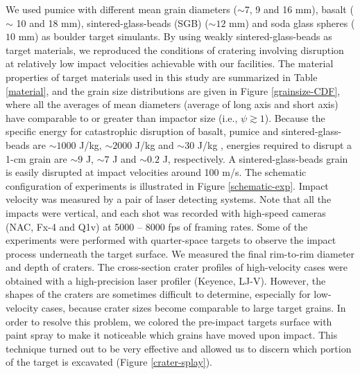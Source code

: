 \documentclass[3p,authoryear]{elsarticle}
\begin{document}
We used pumice with different mean grain diameters ($\sim$7, 9 and 16 mm), basalt ($\sim$ 10 and 18 mm), sintered-glass-beads (SGB) ($\sim 12$ mm) and soda glass spheres ($10$ mm) as boulder target simulants.
By using weakly sintered-glass-beads \citep[e.g.][]{setoh2010} as target materials, we reproduced the conditions of cratering involving disruption at relatively low impact velocities achievable with our facilities.
 The material properties of target materials used in this study are summarized in Table \ref{material}, and the grain size distributions are given in Figure \ref{grainsize-CDF}, where all the averages of mean diameters (average of long axis and short axis) have comparable to or greater than impactor size (i.e., $\psi \gtrsim 1$).
Because the specific energy for catastrophic disruption of basalt, pumice and sintered-glass-beads are $\sim 1000$ J/kg, $\sim 2000$ J/kg and $\sim 30$ J/kg \citep{takagi1984,HH1999,setoh2010,patmore2014,flynn2015}, energies required to disrupt a 1-cm grain are $\sim 9$ J, $\sim 7$ J and $\sim 0.2$ J, respectively.
A sintered-glass-beads grain is easily disrupted at impact velocities around 100 m/s.
The schematic configuration of experiments is illustrated in Figure \ref{schematic-exp}. Impact velocity was measured by a pair of laser detecting systems.
 Note that all the impacts were vertical, and each shot was recorded with high-speed cameras (NAC, Fx-4 and Q1v) at 5000 -- 8000 fps of framing rates.
 Some of the experiments were performed with quarter-space targets to observe the impact process underneath the target surface.
We measured the final rim-to-rim diameter and depth of craters. The cross-section crater profiles of high-velocity cases were obtained with a high-precision laser profiler (Keyence, LJ-V).
However, the shapes of the craters are sometimes difficult to determine, especially for low-velocity cases, because crater sizes become comparable to large target grains.
In order to resolve this problem, we colored the pre-impact targets surface with paint spray to make it noticeable which grains have moved upon impact.
This technique turned out to be very effective and allowed us to discern which portion of the target is excavated (Figure \ref{crater-splay}).
\end{document}
